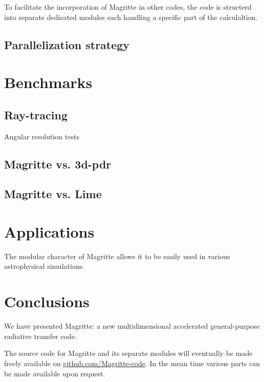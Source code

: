 \documentclass[a4paper,fleqn,usenatbib]{mnras}
\begin{document}
To facilitate the incorporation of Magritte in other codes, the code is structerd into separate dedicated modules each handling a specific part of the calculaltion.

\subsection{Parallelization strategy}




\section{Benchmarks}
\label{Benchmarks}

\subsection{Ray-tracing}

Angular resolution tests

\subsection{{\sc Magritte} vs. {\sc 3d-pdr}}


\subsection{{\sc Magritte} vs. {\sc Lime}}




\section{Applications}
\label{Applications}
The modular character of Magritte allows it to be easily used in various astrophysical simulations.




\section{Conclusions}
\label{Conclusions}
We have presented Magritte: a new multidimensional accelerated general-purpose radiative transfer code.

\bigskip

The source code for Magritte and its separate modules will eventually be made freely available on \href{https://github.com/Magritte-code}{github.com/Magritte-code}. In the mean time various parts can be made available upon request.
\end{document}
